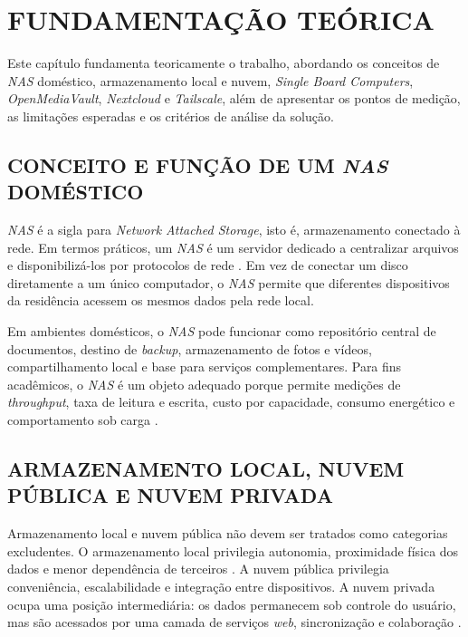 
\chapter{FUNDAMENTAÇÃO TEÓRICA}
\label{cap:fundamentacao}

Este capítulo fundamenta teoricamente o trabalho, abordando os conceitos de \textit{NAS} doméstico, armazenamento local e nuvem, \textit{Single Board Computers}, \textit{OpenMediaVault}, \textit{Nextcloud} e \textit{Tailscale}, além de apresentar os pontos de medição, as limitações esperadas e os critérios de análise da solução.

\section{CONCEITO E FUNÇÃO DE UM \textit{NAS} DOMÉSTICO}

\textit{NAS} é a sigla para \textit{Network Attached Storage}, isto é, armazenamento conectado à rede. Em termos práticos, um \textit{NAS} é um servidor dedicado a centralizar arquivos e disponibilizá-los por protocolos de rede \cite{stallings2018}. Em vez de conectar um disco diretamente a um único computador, o \textit{NAS} permite que diferentes dispositivos da residência acessem os mesmos dados pela rede local.

Em ambientes domésticos, o \textit{NAS} pode funcionar como repositório central de documentos, destino de \textit{backup}, armazenamento de fotos e vídeos, compartilhamento local e base para serviços complementares. Para fins acadêmicos, o \textit{NAS} é um objeto adequado porque permite medições de \textit{throughput}, taxa de leitura e escrita, custo por capacidade, consumo energético e comportamento sob carga \cite{tanenbaum2021}.

\section{ARMAZENAMENTO LOCAL, NUVEM PÚBLICA E NUVEM PRIVADA}

Armazenamento local e nuvem pública não devem ser tratados como categorias excludentes. O armazenamento local privilegia autonomia, proximidade física dos dados e menor dependência de terceiros \cite{mell2011}. A nuvem pública privilegia conveniência, escalabilidade e integração entre dispositivos. A nuvem privada ocupa uma posição intermediária: os dados permanecem sob controle do usuário, mas são acessados por uma camada de serviços \textit{web}, sincronização e colaboração \cite{marinescu2018}.

